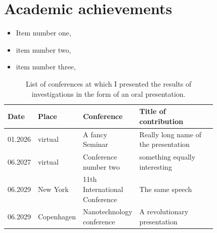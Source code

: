\chapter{Academic achievements}

\lipsum[1]

\begin{itemize}
	\item Item number one, 
	\item item number two, 
	\item item number three, 
\end{itemize}

\lipsum[3]
\vspace{7pt}
\begin{table}[!htbp]
	\centering
	\caption{List of conferences at which I presented the results of investigations in the form of an oral presentation. }
	\label{conferences} 
	\vspace{-5pt}
	\begin{tabular}{@{}lp{0.12\linewidth}p{0.25\linewidth}p{0.45\linewidth}@{}}
		\doublerule
		Date             & Place               & Conference                                                                                     & Title of contribution                                                                                                                         \\ \midrule
		01.2026     & virtual   & A fancy Seminar                                                  & Really long name of the presentation \\
		06.2027     & virtual   &  Conference  number two                                               & something equally interesting               \\
		06.2029     & New York   & 11th International Conference                                                   & The same speech   \\
		06.2029     & Copenhagen   & Nanotechnology conference          & A revolutionary presentation       \\
		\bottomrule 
	\end{tabular}
\end{table}








